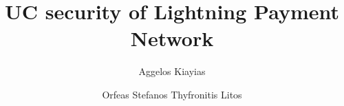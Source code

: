\title{UC security of Lightning Payment Network}
\author{Aggelos Kiayias \and Orfeas Stefanos Thyfronitis Litos}
\maketitle
